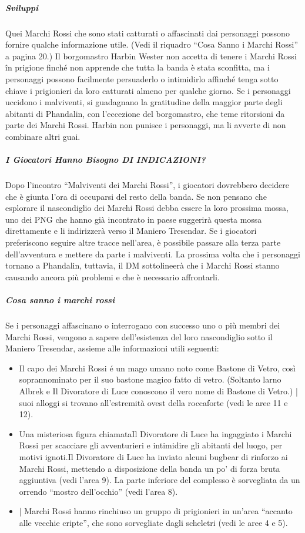 \documentclass{article}
\begin{document}
\subparagraph{Sviluppi}Quei Marchi Rossi che sono stati catturati o affascinati dai
personaggi possono fornire qualche informazione utile.
(Vedi il riquadro “Cosa Sanno i Marchi Rossi” a pagina
20.) Il borgomastro Harbin Wester non accetta di tenere i
Marchi Rossi în prigione finché non apprende che tutta la
banda è stata sconfitta, ma i personaggi possono facilmente
persuaderlo o intimidirlo affinché tenga sotto chiave i
prigionieri da loro catturati almeno per qualche giorno.
Se i personaggi uccidono i malviventi, si guadagnano la
gratitudine della maggior parte degli abitanti di Phandalin,
con l'eccezione del borgomastro, che teme ritorsioni da parte
dei Marchi Rossi. Harbin non punisce i personaggi, ma li
avverte di non combinare altri guai.
\subparagraph{I Giocatori Hanno Bisogno DI INDICAZIONI?}Dopo l'incontro “Malviventi dei Marchi Rossi”, i giocatori dovrebbero
decidere che è giunta l’ora di occuparsi del resto della banda. Se non
pensano che esplorare il nascondiglio dei Marchi Rossi debba essere
la loro prossima mossa, uno dei PNG che hanno già incontrato in
paese suggerirà questa mossa direttamente e li indirizzerà verso il
Maniero Tresendar. Se i giocatori preferiscono seguire altre tracce
nell’area, è possibile passare alla terza parte dell'avventura e mettere
da parte i malviventi. La prossima volta che i personaggi tornano
a Phandalin, tuttavia, il DM sottolineerà che i Marchi Rossi stanno
causando ancora più problemi e che è necessario affrontarli.
\subparagraph{Cosa sanno i marchi rossi}
\hypertarget{cosasanno}{}
Se i personaggi affascinano o interrogano con successo uno o più
membri dei Marchi Rossi, vengono a sapere dell’esistenza del loro
nascondiglio sotto il Maniero Tresendar, assieme alle informazioni
utili seguenti:
\begin{itemize}
    \item  Il capo dei Marchi Rossi é un mago umano noto come Bastone
di Vetro, così soprannominato per il suo bastone magico fatto di
vetro. (Soltanto larno Albrek e Il Divoratore di Luce conoscono il vero
nome di Bastone di Vetro.) | suoi alloggi si trovano all'estremità
ovest della roccaforte (vedi le aree 11 e 12).
    \item  Una misteriosa figura chiamataIl Divoratore di Luce ha ingaggiato i
Marchi Rossi per scacciare gli avventurieri e intimidire gli abitanti
del luogo, per motivi ignoti.Il Divoratore di Luce ha inviato alcuni
bugbear di rinforzo ai Marchi Rossi, mettendo a disposizione
della banda un po’ di forza bruta aggiuntiva (vedi l’area 9).
La parte inferiore del complesso è sorvegliata da un orrendo
“mostro dell'occhio” (vedi l'area 8).
    \item | Marchi Rossi hanno rinchiuso un gruppo di prigionieri in
un'area “accanto alle vecchie cripte”, che sono sorvegliate dagli
scheletri (vedi le aree 4 e 5).
\end{itemize}
\end{document}
